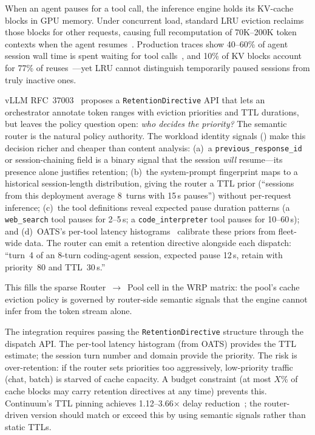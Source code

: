\begin{opportunity}
\label{opp:kv-retention}
When an agent pauses for a tool call, the inference engine holds its
KV-cache blocks in GPU memory.  Under concurrent load, standard LRU
eviction reclaims those blocks for other requests, causing full
recomputation of 70K--200K token contexts when the agent
resumes~\cite{vllm2026rfc37003}.  Production traces show 40--60\% of
agent session wall time is spent waiting for tool
calls~\cite{continuum2025}, and 10\% of KV blocks account for 77\% of
reuses~\cite{vllm2026rfc37003}---yet LRU cannot distinguish
temporarily paused sessions from truly inactive ones.

vLLM RFC~37003~\cite{vllm2026rfc37003} proposes a
\texttt{RetentionDirective} API that lets an orchestrator annotate
token ranges with eviction priorities and TTL durations, but leaves
the policy question open: \emph{who decides the priority?}  The
semantic router is the natural policy authority.  The workload
identity signals () make this
decision richer and cheaper than content analysis:
(a)~a \texttt{previous\_response\_id} or session-chaining field
is a binary signal that the session \emph{will} resume---its
presence alone justifies retention;
(b)~the system-prompt fingerprint maps to a historical
session-length distribution, giving the router a TTL prior
(``sessions from this deployment average 8~turns with 15\,s
pauses'') without per-request inference;
(c)~the tool definitions reveal expected pause duration patterns
(a \texttt{web\_search} tool pauses for 2--5\,s; a
\texttt{code\_interpreter} tool pauses for 10--60\,s);
and (d)~OATS's per-tool latency histograms~\cite{oats2026}
calibrate these priors from fleet-wide data.
The router can emit a retention directive alongside each dispatch:
``turn~4 of an 8-turn coding-agent session, expected pause 12\,s,
retain with priority~80 and TTL~30\,s.''

This fills the sparse Router~$\to$~Pool cell in the WRP matrix: the
pool's cache eviction policy is governed by router-side semantic
signals that the engine cannot infer from the token stream alone.

\begin{frisk}
The integration requires passing the \texttt{RetentionDirective}
structure through the dispatch API.  The per-tool latency histogram
(from OATS) provides the TTL estimate; the session turn number and
domain provide the priority.  The risk is over-retention: if the
router sets priorities too aggressively, low-priority traffic (chat,
batch) is starved of cache capacity.  A budget constraint (at most
$X$\% of cache blocks may carry retention directives at any time)
prevents this.  Continuum's TTL pinning achieves 1.12--3.66$\times$
delay reduction~\cite{continuum2025}; the router-driven version
should match or exceed this by using semantic signals rather than
static TTLs.
\end{frisk}
\end{opportunity}


